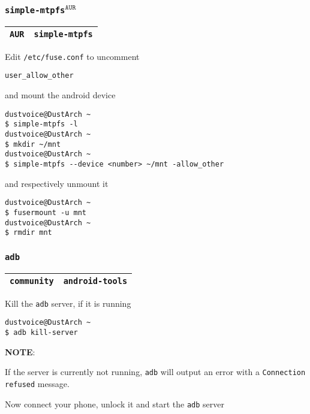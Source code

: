 \documentclass[9pt]{report}
\newcommand{\admonition}[2]{\textbf{#1}: {#2}}
\begin{document}
\vfill\eject

\hypertarget{x-simple-mtpfs-aur}{\subsubsection{\texttt{simple-mtpfs}${}^{\texttt{AUR}}$}}
\begin{center}
\begin{tabular}{|c|c|}
\hline
\texttt{AUR} & \texttt{simple-mtpfs} \\ 
\hline
\end{tabular}
\end{center}

Edit \texttt{/etc/fuse.conf} to uncomment


\begin{verbatim}
user_allow_other
\end{verbatim}

and mount the android device


\begin{verbatim}
dustvoice@DustArch ~
$ simple-mtpfs -l
dustvoice@DustArch ~
$ mkdir ~/mnt
dustvoice@DustArch ~
$ simple-mtpfs --device <number> ~/mnt -allow_other
\end{verbatim}

and respectively unmount it


\begin{verbatim}
dustvoice@DustArch ~
$ fusermount -u mnt
dustvoice@DustArch ~
$ rmdir mnt
\end{verbatim}


\vfill\eject

\hypertarget{x-adb}{\subsubsection{\texttt{adb}}}
\begin{center}
\begin{tabular}{|c|c|}
\hline
\texttt{community} & \texttt{android-tools} \\ 
\hline
\end{tabular}
\end{center}

Kill the \texttt{adb} server, if it is running


\begin{verbatim}
dustvoice@DustArch ~
$ adb kill-server
\end{verbatim}

\admonition{NOTE}{If the server is currently not running, \texttt{adb} will output an error with a \texttt{Connection refused} message.

}
Now connect your phone, unlock it and start the \texttt{adb} server
\end{document}
